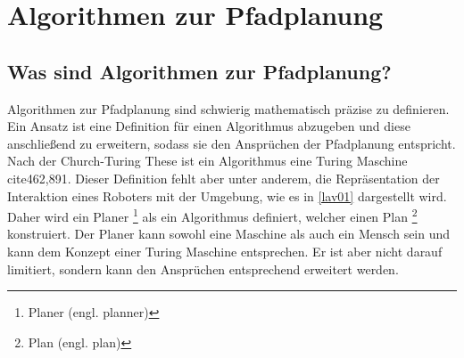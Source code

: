 
\chapter{Algorithmen zur Pfadplanung}
\section{Was sind Algorithmen zur Pfadplanung?}

Algorithmen zur Pfadplanung sind schwierig mathematisch präzise zu definieren. Ein Ansatz ist eine Definition für einen Algorithmus abzugeben und diese anschließend zu erweitern, sodass sie den Ansprüchen der Pfadplanung entspricht. Nach der Church-Turing These ist ein Algorithmus eine Turing Maschine cite{462,891}. Dieser Definition fehlt aber unter anderem, die Repräsentation der Interaktion eines Roboters mit der Umgebung, wie es in \ref{lav01} dargestellt wird. Daher wird ein Planer \footnote{Planer (engl. planner)} als ein Algorithmus definiert, welcher einen Plan \footnote{Plan (engl. plan)} konstruiert. Der Planer kann sowohl eine Maschine als auch ein Mensch sein und kann dem Konzept einer Turing Maschine entsprechen. Er ist aber nicht darauf limitiert, sondern kann den Ansprüchen entsprechend erweitert werden.\cite[~S. 19ff]{Lav06} 

